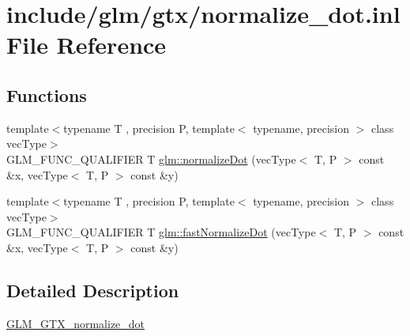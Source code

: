 \hypertarget{normalize__dot_8inl}{}\section{include/glm/gtx/normalize\+\_\+dot.inl File Reference}
\label{normalize__dot_8inl}
\subsection*{Functions}
\begin{DoxyCompactItemize}
\item 
{\footnotesize template$<$typename T , precision P, template$<$ typename, precision $>$ class vec\+Type$>$ }\\G\+L\+M\+\_\+\+F\+U\+N\+C\+\_\+\+Q\+U\+A\+L\+I\+F\+I\+ER T \hyperlink{group__gtx__normalize__dot_gaffbc2f2cb15838de8886a68048f9004d}{glm\+::normalize\+Dot} (vec\+Type$<$ T, P $>$ const \&x, vec\+Type$<$ T, P $>$ const \&y)
\item 
{\footnotesize template$<$typename T , precision P, template$<$ typename, precision $>$ class vec\+Type$>$ }\\G\+L\+M\+\_\+\+F\+U\+N\+C\+\_\+\+Q\+U\+A\+L\+I\+F\+I\+ER T \hyperlink{group__gtx__normalize__dot_ga8593b21bc2fe22184f01d5e08b5a2024}{glm\+::fast\+Normalize\+Dot} (vec\+Type$<$ T, P $>$ const \&x, vec\+Type$<$ T, P $>$ const \&y)
\end{DoxyCompactItemize}


\subsection{Detailed Description}
\hyperlink{group__gtx__normalize__dot}{G\+L\+M\+\_\+\+G\+T\+X\+\_\+normalize\+\_\+dot} 